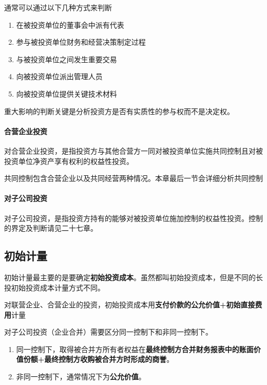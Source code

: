 \documentclass[UTF8,12pt]{ctexart}
\numberwithin{equation}{section} %
\numberwithin{figure}{section}
\numberwithin{table}{section}
\begin{document}
	通常可以通过以下几种方式来判断
	\begin{enumerate}
		\item 在被投资单位的董事会中派有代表
		
		\item 参与被投资单位财务和经营决策制定过程
		
		\item 与被投资单位之间发生重要交易
		
		\item 向被投资单位派出管理人员
		
		\item 向被投资单位提供关键技术材料
	\end{enumerate}
	
	重大影响的判断关键是分析投资方是否有实质性的参与权而不是决定权。
	
	\paragraph{合营企业投资}
	对合营企业投资，是指投资方与其他合营方一同对被投资单位实施共同控制且对被投资单位净资产享有权利的权益性投资。
	
	共同控制包含合营企业以及共同经营两种情况。本章最后一节会详细分析共同控制
	
	\paragraph{对子公司投资}
	对子公司投资，是指投资方持有的能够对被投资单位施加控制的权益性投资。控制的界定及判断请见二十七章。
	
	\subsection{初始计量}
	初始计量最主要的是要确定\textbf{初始投资成本}。虽然都叫初始投资成本，但是不同的长投初始投资成本计量方式不同。
	
	对联营企业、合营企业的投资，初始投资成本用\textbf{支付价款的公允价值+初始直接费用}计量
	
	对子公司投资（企业合并）需要区分同一控制下和非同一控制下。
	\begin{enumerate}
		\item 同一控制下，取得被合并方所有者权益在\textbf{最终控制方合并财务报表中的账面价值份额+最终控制方收购被合并方时形成的商誉}。
		
		\item 非同一控制下，通常情况下为\textbf{公允价值}。
	\end{enumerate}
	
\end{document}
